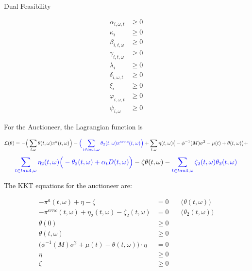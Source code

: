 \documentclass[11pt, letterpaper]{article}
\newcommand{\pia}{\textcolor[rgb]{0,0,1}}
\begin{document}
\begin{flushleft}
Dual Feasibility
\end{flushleft}

\begin{align}
    \alpha_{i,\omega,t} & \geq 0 \\
    \kappa_i & \geq 0 \\
    \beta_{i,t,\omega} & \geq 0 \\
    \gamma_{i,t,\omega} & \geq 0 \\
    \lambda_i & \geq 0 \\
    \delta_{i,\omega,t} & \geq 0 \\
    \xi_i & \geq 0 \\
    \varphi_{i,\omega,t} & \geq 0 \\
    \psi_{i,\omega} & \geq 0
\end{align}

For the Auctioneer, the Lagrangian function is 

\begin{equation}
    \mathcal{L}(\theta)=  -\Big(\sum_{t,\omega} \theta(t,\omega) \pi^{a}(t,\omega)\Big) -\pia{\Big( \sum_{t \in tau4, \omega}\theta_2(t,\omega)\pi^{ernc}(t,\omega)\Big)} + \sum_{t,\omega} \eta(t,\omega) \big(-\phi^{-1}(M) \sigma^2 - \mu(t) +\theta(t,\omega)\big) +
    \end{equation}
    \begin{equation}
    \pia{\sum_{t \in tau4, \omega} \eta_2(t,\omega)\Big(-\theta_2(t,\omega)+\alpha_t D(t,\omega)\Big)} -\zeta \theta(t,\omega) - \pia{\sum_{t \in tau4, \omega}\zeta_2(t,\omega)\theta_2(t,\omega)} \nonumber 
\end{equation}

The KKT equations for the auctioneer are:

\begin{align}
    -\pi^a(t,\omega)+\eta-\zeta & = 0 & \quad \big(\theta(t,\omega)\big)\\
    -\pi^{ernc}(t,\omega)+\eta_2(t,\omega)-\zeta_2(t,\omega) & = 0 & \quad \big(\theta_2(t,\omega)\big)\\
    \theta(0) & \geq  0 \\
    \theta(t,\omega) & \geq  0 \\
    \Big(\phi^{-1}(M) \sigma^2 + \mu(t) -\theta(t,\omega)\Big)\cdot \eta & =  0\\
    \eta & \geq  0\\
    \zeta & \geq 0
\end{align}
\end{document}
